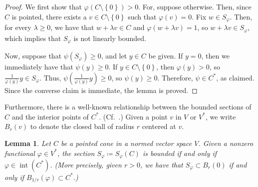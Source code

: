 \documentclass[10pt]{amsart}
\newtheorem{lemma}[thm]{Lemma}
\theoremstyle{definition}
\theoremstyle{remark}
\begin{document}
\begin{proof}
   We first show that ${\varphi}(C \setminus {\left\lbrace {0} \right\rbrace}) > 0$.  For,
   suppose otherwise.  Then, since $C$ is pointed, there exists a
   $v \in C \setminus {\left\lbrace {0} \right\rbrace}$ such that ${\varphi}(v) = 0$.  Fix $w
   \in S_{\varphi}$.  Then, for every $\lambda \ge 0$, we have that
   $w + \lambda v \in C$ and ${\varphi}(w + \lambda v) = 1$, so $w +
   \lambda v \in S_{\varphi}$, which implies that $S_{\varphi}$ is not
   linearly bounded.
   
   Now, suppose that $\psi(S_{\varphi}) \ge 0$, and let $y \in C$ be
   given.  If $y = 0$, then we immediately have that $\psi(y) \ge
   0$.  If $y \in C \setminus {\left\lbrace {0} \right\rbrace}$, then ${\varphi}(y) > 0$, so
   $\frac{1}{{\varphi}(y)}y \in S_{\varphi}$.  Thus,
   $\psi(\frac{1}{{\varphi}(y)}y) \ge 0$, so $\psi(y) \ge 0$.
   Therefore, $\psi \in {C^{\ast}}$, as claimed.  Since the converse
   claim is immediate, the lemma is proved.
\end{proof}

Furthermore, there is a well-known relationship between the
bounded sections of $ C $ and the interior points of ${C^{\ast}}$.
(Cf.~\cite[Theorem 3.8.4]{Jameson}.)  Given a point $v$ in $V$ or
${V^{\ast}}$, we write $B_{r}(v)$ to denote the closed ball of radius
$r$ centered at $v$.

\begin{lemma}
   \label{lem:InteriorNormalsGiveBoundedSections}
   Let $C$ be a pointed cone in a normed vector space $V$.  Given
   a nonzero functional ${\varphi} \in {V^{\ast}}$, the section $S_{\varphi}
   {\mathrel{\coloneqq}} S_{\varphi}(C)$ is bounded if and only if ${\varphi} \in
   {\operatorname{int}}({C^{\ast}})$.  \textup{(}More precisely, given $ r > 0$,
   we have that $S_{\varphi} \subset B_{r}(0)$ if and only if
   $B_{1/r}({\varphi}) \subset {C^{\ast}}$.\textup{)}
\end{lemma}
\end{document}
